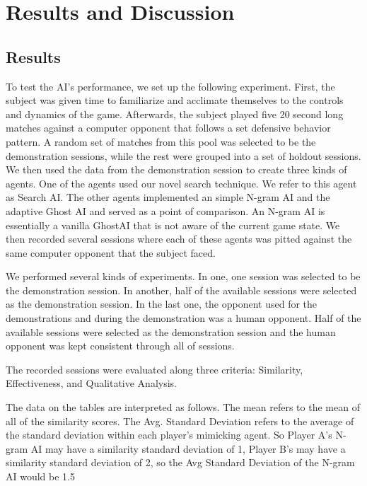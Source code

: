 
\chapter{Results and Discussion}

\label{Chapter5} %

\section{Results}

To test the AI's performance, we set up the following experiment. First, the subject was given time to familiarize and acclimate themselves to the controls and dynamics of the game. Afterwards, the subject played five 20 second long matches against a computer opponent that follows a set defensive behavior pattern. A random set of matches from this pool was selected to be the demonstration sessions, while the rest were grouped into a set of holdout sessions. We then used the data from the demonstration session to create three kinds of agents. One of the agents used our novel search technique. We refer to this agent as Search AI. The other agents implemented an simple N-gram AI and the adaptive Ghost AI and served as a point of comparison. An N-gram AI is essentially a vanilla GhostAI that is not aware of the current game state. We then recorded several sessions where each of these agents was pitted against the same computer opponent that the subject faced.

We performed several kinds of experiments. In one, one session was selected to be the demonstration session. In another, half of the available sessions were selected as the demonstration session. In the last one, the opponent used for the demonstrations and during the demonstration was a human opponent. Half of the available sessions were selected as the demonstration session and the human opponent was kept consistent through all of sessions.

The recorded sessions were evaluated along three criteria: Similarity, Effectiveness, and Qualitative Analysis. 

The data on the tables are interpreted as follows. The mean refers to the mean of all of the similarity scores. The Avg. Standard Deviation refers to the average of the standard deviation within each player's mimicking agent. So Player A's N-gram AI may have a similarity standard deviation of 1, Player B's may have a similarity standard deviation of 2, so the Avg Standard Deviation of the N-gram AI would be 1.5

